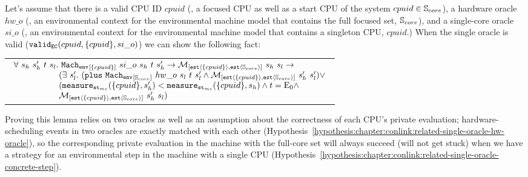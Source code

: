 \begin{lemma}
\label{lemma:chapter:conlink:one-env-refines-env}
Let's assume that there is a valid CPU ID $cpuid$ (\ie, a focused CPU as well as a start CPU of the system
$cpuid \in {\mathbb{S}_{core}}$),  a hardware oracle $hw\_o$ (\ie, an environmental context for the environmental machine model that contains the full focused set, ${\mathbb{S}_{core}}$), 
and a single-core oracle $si\_o$ (\ie, an environmental context for the environmental machine model that contains a singleton CPU, $cpuid$.)
When the single oracle is valid ($ {{\mathrm{\texttt{valid}}}_{{\mathrm{\texttt{EC}}}}}({cpuid}, {\{cpuid\}}, {si\_o})$) we can show the following fact:
\begin{center}
\begin{tabular}{P{0.95\textwidth}}
$
\begin{array}{l}
\forall \ s_h \ s_h' \ t \ s_l. \ \envstep{\set{cpuid}}{si\_o}{s_h}{t}{s_h'} \rightarrow  \matchestateestate{\set{cpuid}}{s_h}{s_l} \rightarrow \\
\ \ \ \ \ \ \ \ \ \ \ \ \ \ \ \ (\exists \ s_l' .\ (\ccplusstep{\envstep{\coreset}{hw\_o}{s_l}{t}{s_l'}} \wedge \matchestateestate{\set{cpuid}}{s_h'}{s_l'}) \vee \\ 
\ \ \ \ \ \ \ \ \ \ \ \ \ \ \ \ (\mcstatemeasurenoeq{\set{cpuid}}{s_h'} < \mcstatemeasurenoeq{\set{cpuid}}{s_h} \wedge t = \ccemptytrace \wedge \\ 
\ \ \ \ \ \ \ \ \ \ \ \ \ \ \ \ \matchestateestate{\set{cpuid}}{s_h'}{s_l})\\
\end{array}
$
\end{tabular}
\end{center}
\end{lemma}

Proving this lemma relies on two oracles 
as well as an assumption about the correctness of each CPU's private evaluation;
hardware-scheduling events in two oracles are exactly matched with each other (Hypothesis~\ref{hypothesis:chapter:conlink:related-single-oracle-hw-oracle}), so
the corresponding private evaluation in the machine with the full-core set
will always succeed (will not get stuck) when we have a strategy for an environmental step in the machine with a single CPU
(Hypothesis~\ref{hypothesis:chapter:conlink:related-single-oracle-concrete-step}).

